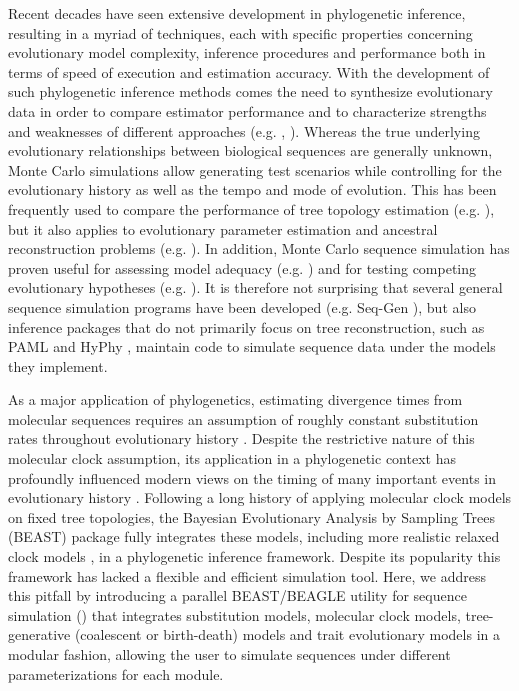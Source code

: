 Recent decades have seen extensive development in phylogenetic inference, resulting in a myriad of techniques, each with specific properties concerning
evolutionary model complexity, inference procedures and performance both in terms of speed of execution and estimation accuracy.
With the development of such phylogenetic inference methods comes the need to synthesize evolutionary data in order to compare estimator performance and to characterize strengths and weaknesses of different approaches (e.g. \cite{Arenas2012}, \cite{Hoban2011}).
Whereas the true underlying evolutionary relationships between biological sequences are generally unknown,
Monte Carlo simulations allow generating test scenarios while controlling for the evolutionary history as well as the tempo and mode of evolution. 
This has been frequently used to compare the performance of tree topology estimation (e.g. \cite{Stamatakis2005}), but it also applies to evolutionary parameter estimation and ancestral reconstruction problems (e.g. \cite{Blanchette2008}).
In addition, Monte Carlo sequence simulation has proven useful for assessing model adequacy (e.g. \cite{Brown2009}) and for testing competing evolutionary hypotheses (e.g. \cite{Goldman1993}).
It is therefore not surprising 
that several general sequence simulation programs have been developed (e.g. Seq-Gen \cite{Rambaut1997}), but also inference packages that do not primarily focus on tree reconstruction, such as PAML \cite{PAML} and HyPhy \cite{HyPhy}, maintain code to simulate sequence data under the models they implement.

As a major application of phylogenetics, estimating divergence times from molecular sequences requires an assumption of roughly constant substitution rates throughout evolutionary history \citep{Zuckerkandl1962}. 
Despite the restrictive nature of this molecular clock assumption, its application in a phylogenetic context has profoundly influenced modern views on the timing of many important events in evolutionary history \citep{Arbogast2002}. 
Following a long history of applying molecular clock models on fixed tree topologies, the Bayesian Evolutionary Analysis by Sampling Trees (BEAST) package \citep{Drummond2012} fully integrates these models, including more realistic relaxed clock models \citep{Drummond2006,Drummond2010}, in a phylogenetic inference framework.
Despite its popularity this framework has lacked a flexible and efficient simulation tool.
Here, we address this pitfall by introducing a parallel BEAST/BEAGLE utility for sequence simulation ({\bussname}) that integrates substitution models, molecular clock models, tree-generative (coalescent or birth-death) models and trait evolutionary models in a modular fashion, allowing the user to simulate sequences under different parameterizations for each module.

